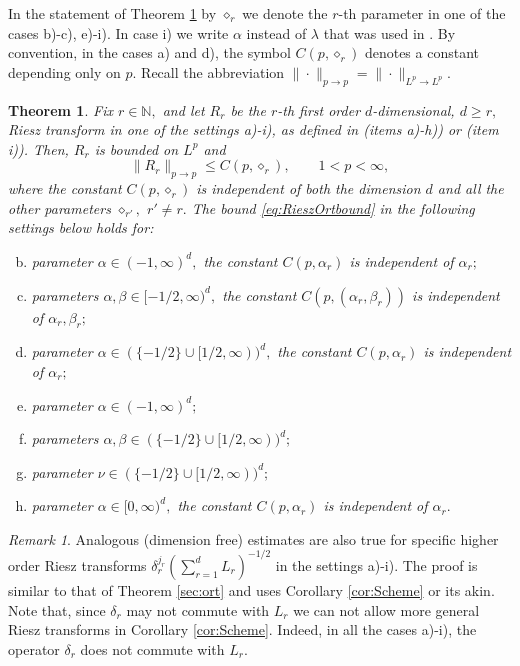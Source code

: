 \documentclass[leqno,12pt]{amsart}
\newtheorem{thm}{Theorem}[section]
\theoremstyle{definition}
\theoremstyle{remark}
\newtheorem*{remark}{Remark}
\begin{document}
In the statement of Theorem \ref{thm:RieszOrt} by $\diamond_{r}$ we denote the $r$-th parameter in one of the cases b)-c), e)-i). In case i) we write $\alpha$ instead of ${\lambda}$ that was used in \cite{Bet1}. By convention, in the cases a) and d), the symbol $C(p,\diamond_r)$ denotes a constant depending only on $p.$ Recall the abbreviation $\|\cdot\|_{p\to p}=\|\cdot\|_{L^p\to L^p}.$
\begin{thm}
\label{thm:RieszOrt} Fix $r\in\mathbb{N},$ and let $R_r$ be the $r$-th first order $d$-dimensional, $d \geq r,$ Riesz transform in one of the settings a)-i), as defined in \cite[Sections 7.1-7.8]{NSRiesz} (items a)-h)) or \cite[p.946]{Bet1} (item i)). Then, $R_r$ is bounded on $L^p$ and
\begin{equation}
\label{eq:RieszOrtbound}
\|R_r\|_{p\to p}\leq C(p,\diamond_r),\qquad 1<p<\infty,
\end{equation}
where the constant $C(p,\diamond_r)$ is independent of both the dimension $d$ and all the other parameters $\diamond_{r'},$ $r'\neq r.$ The bound \eqref{eq:RieszOrtbound} in the following settings below holds for:
\begin{enumerate}[a)]
\setcounter{enumi}{1}
\item parameter $\alpha\in(-1,\infty)^d,$ the constant $C(p,\alpha_r)$ is independent of $\alpha_r;$
\item parameters $\alpha,\beta\in[-1/2,\infty)^d,$ the constant $C(p,(\alpha_r,\beta_r))$ is independent of $\alpha_r,\beta_r;$
\setcounter{enumi}{4}
\item parameter $\alpha\in (\{-1/2\}\cup [1/2,\infty))^d,$ the constant $C(p,\alpha_r)$ is independent of $\alpha_r;$
\item parameter $\alpha\in (-1,\infty)^d;$
\item parameters $\alpha,\beta\in(\{-1/2\}\cup [1/2,\infty))^d;$
\item parameter $\nu\in (\{-1/2\}\cup [1/2,\infty))^d;$
\item parameter $\alpha \in [0,\infty)^d,$ the constant $C(p,\alpha_r)$ is independent of $\alpha_r.$
\end{enumerate}
\end{thm}
\begin{remark}
Analogous (dimension free) estimates are also true for specific higher order Riesz transforms $\delta_r^{j_r}(\sum_{r=1}^d L_r)^{-1/2}$ in the settings a)-i). The proof is similar to that of Theorem \ref{sec:ort} and uses Corollary \ref{cor:Scheme} or its akin. Note that, since $\delta_r$ may not commute with $L_r$ we can not allow more general Riesz transforms in Corollary \ref{cor:Scheme}. Indeed, in all the cases a)-i), the operator $\delta_r$ does not commute with $L_r$.
\end{remark}
\end{document}
